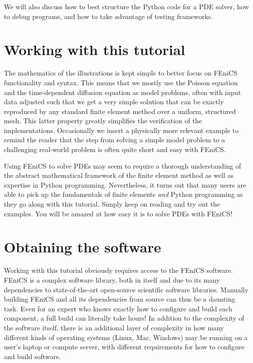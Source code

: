 \documentclass[graybox,envcountchap,sectrefs,final]{svmonodo}
\begin{document}
We will also discuss how to best structure the Python code for
a PDE solver, how to debug programs, and how to take advantage
of testing frameworks.

\section{Working with this tutorial}

The mathematics of the illustrations is kept simple to better focus on
FEniCS functionality and syntax. This means that we mostly use the
Poisson equation and the time-dependent diffusion equation as model
problems, often with input data adjusted such that we get a very
simple solution that can be exactly reproduced by any standard finite
element method over a uniform, structured mesh. This latter property
greatly simplifies the verification of the implementations.
Occasionally we insert a physically more relevant example to remind
the reader that the step from solving a simple model problem to a
challenging real-world problem is often quite short and easy with FEniCS.


Using FEniCS to solve PDEs may seem to require a thorough
understanding of the abstract mathematical framework of the finite
element method as well as expertise in Python programming.
Nevertheless, it turns out that many users are able to pick up the
fundamentals of finite elements \emph{and} Python programming as they go
along with this tutorial. Simply keep on reading and try out the
examples. You will be amazed at how easy it is to solve PDEs with
FEniCS!

\section{Obtaining the software}

Working with this tutorial obviously requires access to the FEniCS
software. FEniCS is a complex software library, both in itself and due
to its many dependencies to state-of-the-art open-source scientific
software libraries. Manually building FEniCS and all its dependencies
from source can thus be a daunting task. Even for an expert who knows
exactly how to configure and build each component, a full build can
literally take hours! In addition to the complexity of the software
itself, there is an additional layer of complexity in how many
different kinds of operating systems (Linux, Mac, Windows)
may be running on a user's laptop or compute server, with
different requirements for how to configure and build software.
\end{document}
